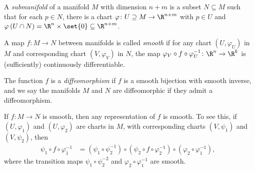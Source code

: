 \documentclass[10pt]{mypackage}
\begin{document}
\begin{definition}
  A \textit{submanifold} of a manifold $M$ with dimension $ n + m $ is a subset $N\subseteq M$ such that for each $p\in N$, there is a chart $\varphi\colon U\supseteq M\rightarrow \R^{n+m}$ with $p\in U$ and $\varphi\left( U\cap N \right) = \R^{n}\times \set{0}\subseteq \R^{n + m}$.
\end{definition}
\begin{definition}
  A map $f\colon M\rightarrow N$ between manifolds is called \textit{smooth} if for any chart $\left( U,\varphi_U \right)$ in $M$ and corresponding chart $\left( V,\varphi_V \right)$ in $N$, the map $\varphi_V\circ f \circ \varphi_U^{-1}\colon \R^n\rightarrow \R^k$ is (sufficiently) continuously differentiable.\newline

  The function $f$ is a \textit{diffeomorphism} if $f$ is a smooth bijection with smooth inverse, and we say the manifolds $M$ and $N$ are diffeomorphic if they admit a diffeomorphism.
\end{definition}
\begin{remark}
  If $f\colon M\rightarrow N$ is smooth, then any representation of $f$ is smooth. To see this, if $\left( U,\varphi_1 \right)$ and $\left( U,\varphi_2 \right)$ are charts in $M$, with corresponding charts $\left( V,\psi_1 \right)$ and $\left( V,\psi_2 \right)$, then
  \begin{align*}
    \psi_{1}\circ f \circ \varphi_1^{-1} &= \left( \psi_1\circ \psi_2^{-1} \right)\circ \left( \psi_2\circ f \circ \varphi_2^{-1} \right)\circ \left( \varphi_2\circ \varphi_1^{-1} \right),
  \end{align*}
  where the transition maps $\psi_1\circ \psi_2^{-2}$ and $\varphi_2\circ \varphi_1^{-1}$ are smooth.
\end{remark}
\end{document}
